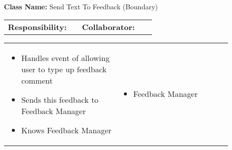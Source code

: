 \begin{red_cards}[]
    \textbf{Class Name:} Send Text To Feedback (Boundary)
    \tcbline
    \begin{tabular}{p{0.45\linewidth} | p{0.45\linewidth}}
        \textbf{Responsibility:}& 
        \textbf{Collaborator:}\\
    \end{tabular}
    \tcbline
    \begin{tabular}{p{0.45\linewidth} | p{0.45\linewidth}}
        \begin{itemize}
            \item Handles event of allowing user to type up feedback comment
            \item Sends this feedback to Feedback Manager
            \item Knows Feedback Manager
        \end{itemize}
        &
        \begin{itemize}
            \item Feedback Manager
        \end{itemize}
    \end{tabular}
\end{red_cards}